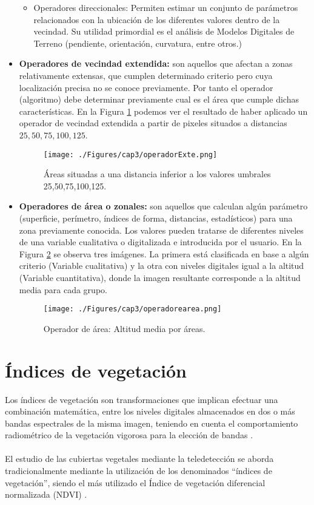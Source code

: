 \begin{itemize}
\begin{itemize}
			\item Operadores direccionales: Permiten estimar un conjunto de par\'ametros relacionados con la ubicaci\'on de los diferentes valores dentro de la vecindad. Su utilidad primordial es el an\'alisis de Modelos Digitales de Terreno (pendiente, orientaci\'on, curvatura, entre otros.)
		\end{itemize}		
		\item  \textbf{Operadores de vecindad extendida:} son aquellos que afectan a zonas relativamente extensas, que cumplen determinado criterio pero cuya localizaci\'on precisa no se conoce previamente. Por tanto el operador (algoritmo) debe determinar previamente cual es el \'area que cumple dichas caracter\'isticas. En la Figura \ref{fig:oplvecext} podemos ver el resultado de haber aplicado un operador de vecindad extendida a partir de pixeles situados a distancias $ 25,50,75,100,125 $.
						  \begin{figure}[H]
						  	\centering
						  	\texttt{[image: ./Figures/cap3/operadorExte.png]}
						  	\caption{\'Areas situadas a una distancia inferior a los valores umbrales 25,50,75,100,125.}
						  	\label{fig:oplvecext}
						  \end{figure}		
		\item \textbf{Operadores de \'area o zonales:} son aquellos que calculan alg\'un par\'ametro (superficie, per\'imetro, \'indices de forma, distancias, estad\'isticos) para una zona previamente conocida. Los valores pueden tratarse de diferentes niveles de una variable cualitativa o digitalizada e introducida por el usuario. En la Figura \ref{fig:oplarea} se observa tres im\'agenes. La primera est\'a clasificada en base a alg\'un criterio (Variable cualitativa) y la otra con niveles digitales igual a la altitud (Variable cuantitativa), donde la imagen resultante corresponde a la altitud media para cada grupo.
								  \begin{figure}[H]
								  	\centering
								  	\texttt{[image: ./Figures/cap3/operadorearea.png]}
								  	\caption{Operador de \'area: Altitud media por \'areas.}
								  	\label{fig:oplarea}
								  \end{figure}		
		
		\end{itemize}
 
\section{\'Indices de vegetaci\'on}
Los \'indices de vegetaci\'on son transformaciones que implican efectuar una combinaci\'on matem\'atica, entre los niveles digitales almacenados en dos o m\'as bandas espectrales de la misma imagen, teniendo en cuenta el comportamiento radiom\'etrico de la vegetaci\'on vigorosa para la elecci\'on de bandas \cite{speranza2005potencialidad}. \\~\\
El estudio de las cubiertas vegetales mediante la teledetecci\'on se aborda tradicionalmente mediante la utilizaci\'on de los denominados “\'indices de vegetaci\'on”, siendo el m\'as utilizado el \'Indice de vegetaci\'on diferencial normalizada (NDVI) \cite{sader2000estimacion}.

